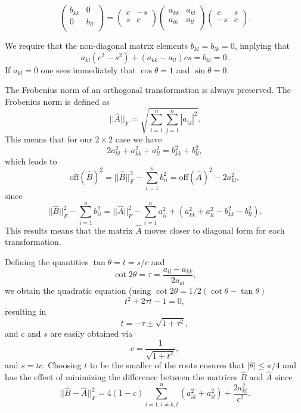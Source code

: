 \[
 \left( \begin{array}{cc} b_{kk} & 0 \\
                          0 & b_{ll} \\\end{array} \right)  =  \left( \begin{array}{cc} c & -s \\
                          s &c \\\end{array} \right)  \left( \begin{array}{cc} a_{kk} & a_{kl} \\
                          a_{lk} &a_{ll} \\\end{array} \right) \left( \begin{array}{cc} c & s \\
                          -s & c \\\end{array} \right).
\]


We require that the non-diagonal matrix elements $b_{kl}=b_{lk}=0$, implying that 
\[
a_{kl}(c^2-s^2)+(a_{kk}-a_{ll})cs = b_{kl} = 0.
\]
If $a_{kl}=0$ one sees immediately that $\cos\theta = 1$ and $\sin\theta=0$.

The Frobenius norm of an orthogonal transformation is always preserved. The Frobenius norm is defined
as 
\[
||\hat{A}||_F =  \sqrt{\sum_{i=1}^n\sum_{j=1}^n |a_{ij}|^2}.
\]
This means that for our $2\times 2$ case  we have
\[
2a_{kl}^2+a_{kk}^2+a_{ll}^2 = b_{kk}^2+b_{ll}^2,
\]
which leads to
\[
\mathrm{off}(\hat{B})^2 = ||\hat{B}||_F^2-\sum_{i=1}^nb_{ii}^2=\mathrm{off}(\hat{A})^2-2a_{kl}^2,
\]
since 
\[
||\hat{B}||_F^2-\sum_{i=1}^nb_{ii}^2=||\hat{A}||_F^2-\sum_{i=1}^na_{ii}^2+(a_{kk}^2+a_{ll}^2 -b_{kk}^2-b_{ll}^2).
\]
This results means that  the matrix $\hat{A}$ moves closer to diagonal form  for each transformation.


Defining the quantities $\tan\theta = t= s/c$ and
\[\cot 2\theta=\tau = \frac{a_{ll}-a_{kk}}{2a_{kl}},
\]
we obtain the quadratic equation (using $\cot 2\theta=1/2(\cot \theta-\tan\theta)$
\[
t^2+2\tau t-1= 0,
\]
resulting in 
\[
  t = -\tau \pm \sqrt{1+\tau^2},
\]
and $c$ and $s$ are easily obtained via
\[
   c = \frac{1}{\sqrt{1+t^2}},
\]
and $s=tc$.  Choosing $t$ to be the smaller of the roots ensures that $|\theta| \le \pi/4$ and has the 
effect of minimizing the difference between the matrices $\hat{B}$ and $\hat{A}$ since
\[
||\hat{B}-\hat{A}||_F^2=4(1-c)\sum_{i=1,i\ne k,l}^n(a_{ik}^2+a_{il}^2) +\frac{2a_{kl}^2}{c^2}.
\]



